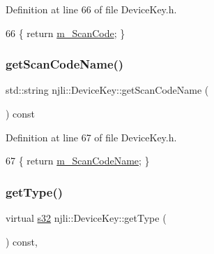 Definition at line 66 of file Device\+Key.\+h.


\begin{DoxyCode}
66 \{ \textcolor{keywordflow}{return} \mbox{\hyperlink{classnjli_1_1_device_key_a326eb4f8f1b7abc2b916c8ed11d8dca6}{m\_ScanCode}}; \}
\end{DoxyCode}
\mbox{\label{classnjli_1_1_device_key_a1e9dfe1c89d373a70d12a81de08c29e3}} 
\subsubsection{\texorpdfstring{get\+Scan\+Code\+Name()}{getScanCodeName()}}
{\footnotesize\ttfamily std\+::string njli\+::\+Device\+Key\+::get\+Scan\+Code\+Name (\begin{DoxyParamCaption}{ }\end{DoxyParamCaption}) const\hspace{0.3cm}{\ttfamily [inline]}}



Definition at line 67 of file Device\+Key.\+h.


\begin{DoxyCode}
67 \{ \textcolor{keywordflow}{return} \mbox{\hyperlink{classnjli_1_1_device_key_ac619bfe3e166c9f9ddda4e308f4315d9}{m\_ScanCodeName}}; \}
\end{DoxyCode}
\mbox{\label{classnjli_1_1_device_key_aa7b5696085bd6c8a1a935d422ae51e1f}} 
\subsubsection{\texorpdfstring{get\+Type()}{getType()}}
{\footnotesize\ttfamily virtual \mbox{\hyperlink{_util_8h_aa62c75d314a0d1f37f79c4b73b2292e2}{s32}} njli\+::\+Device\+Key\+::get\+Type (\begin{DoxyParamCaption}{ }\end{DoxyParamCaption}) const\hspace{0.3cm}{\ttfamily [inline]}, {\ttfamily [virtual]}}



